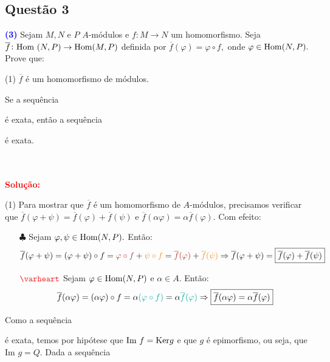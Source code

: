 \documentclass[11pt,a4paper]{article}
\newcommand{\questao}[1]{\subsection{Questão #1} \textcolor{blue}{\bf(#1)}}
\newcommand{\dividiritens}[1]{\begin{tasks}[counter-format={(tsk[a])},label-width=3.6ex, label-format = {\bfseries}, column-sep = {0pt}](1) #1 \end{tasks}}
\newcommand{\pers}[1]{\textcolor{Floresta}{$\negrito{(#1)} $}}
\newcommand{\solucao}[1]{
\textbf{\textcolor{white}{oi}\\ \\ \textcolor{red}{Solução:}} #1}
\begin{document}
\questao{3} Sejam $M, N$ e $P$ $A$-módulos e $f \colon M \to N$ um homomorfismo. Seja $\overline{f} \colon \mbox{Hom } (N,P) \to {\rm Hom }(M,P)$ definida por $\overline{f}(\varphi) = \varphi \circ f,$  onde $\varphi \in {\rm Hom }(N,P).$ Prove que:
\dividiritens{
\task[\pers{a}] $\overline{f}$ é um homomorfismo de módulos.

\task[\pers{b}] Se a sequência }
\begin{center}
\end{center}
é exata, então a sequência
\begin{center}
\end{center}
é exata.
\solucao{
\dividiritens{
\task[\pers{a}] Para mostrar que $\overline{f}$ é um homomorfismo de $A$-módulos, precisamos verificar que $\overline{f}(\varphi + \psi) = \overline{f}(\varphi) + \overline{f}(\psi)$ e $\overline{f}(\alpha \varphi) = \alpha \overline{f}(\varphi).$ Com efeito:
\begin{itemize}
    \item[$\clubsuit$] Sejam $\varphi, \psi \in {\rm Hom }(N,P).$ Então:
    \[
    \overline{f}(\varphi + \psi) = (\varphi + \psi) \circ f = \textcolor{Mahogany}{\varphi \circ f} + \textcolor{BurntOrange}{\psi \circ f} = \textcolor{Mahogany}{\overline{f}(\varphi)} + \textcolor{BurntOrange}{\overline{f}(\psi)} \Rightarrow \overline{f}(\varphi + \psi) = \boxed{\overline{f}(\varphi) + \overline{f}(\psi)}
    \]
    \item[$\textcolor{Red}{\varheart}$]  Sejam $\varphi \in {\rm Hom }(N,P)$ e $\alpha \in A.$ Então:
    \[
    \overline{f}(\alpha \varphi) = (\alpha \varphi) \circ f = \alpha \textcolor{Emerald}{(\varphi \circ f)} = \alpha \textcolor{Emerald}{\overline{f}(\varphi)} \Rightarrow \boxed{\overline{f}(\alpha \varphi) = \alpha \overline{f}(\varphi)}
    \]
\end{itemize}

\task[\pers{b}] Como a sequência}} \begin{center}
\end{center} é exata, temos por hipótese que $\mbox{Im } f = {\rm Ker} g$ e que $g$ é epimorfismo, ou seja, que $\mbox{Im } g = Q.$ Dada a sequência
\end{document}
